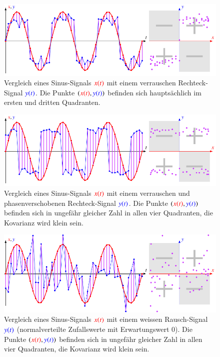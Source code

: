 \begin{figure}
\centering
\includegraphics[width=\hsize]{chapters/1-geometrie/images/sinrect.pdf}
\caption{Vergleich eines Sinus-Signals $\color{red}x(t)$ mit einem
verrauschen Rechteck-Signal $\color{blue}y(t)$.
Die Punkte $({\color{red}x(t)},{\color{blue}y(t)})$ befinden sich
hauptsächlich im ersten und dritten Quadranten.
\label{geometrie:kovarianz:sinrect:image}}
\end{figure}
\begin{figure}
\centering
\includegraphics[width=\hsize]{chapters/1-geometrie/images/cosrect.pdf}
\caption{Vergleich eines Sinus-Signals $\color{red}x(t)$ mit einem
verrauschen und phasenverschobenen Rechteck-Signal $\color{blue}y(t)$.
Die Punkte $({\color{red}x(t)},{\color{blue}y(t)})$ befinden sich
in ungefähr gleicher Zahl in allen vier Quadranten, die Kovarianz
wird klein sein.
\label{geometrie:kovarianz:cosrect:image}}
\end{figure}
\begin{figure}
\centering
\includegraphics[width=\hsize]{chapters/1-geometrie/images/sinrand.pdf}
\caption{Vergleich eines Sinus-Signals $\color{red}x(t)$ mit einem
weissen Rausch-Signal $\color{blue}y(t)$ (normalverteilte Zufallswerte
mit Erwartungswert $0$).
Die Punkte $({\color{red}x(t)},{\color{blue}y(t)})$ befinden sich
in ungefähr gleicher Zahl in allen vier Quadranten, die Kovarianz
wird klein sein.
\label{geometrie:kovarianz:sinrand:image}}
\end{figure}


